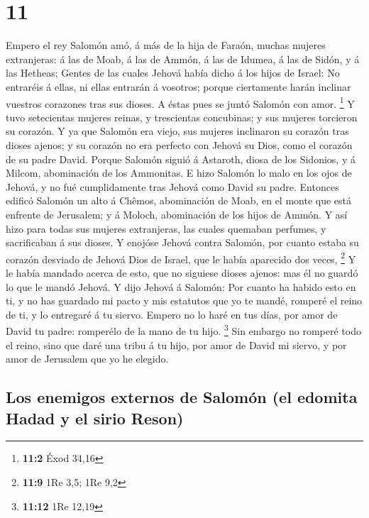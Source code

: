 \hypertarget{section-10}{%
\section{11}\label{section-10}}

 Empero el rey Salomón amó, á más de la hija de Faraón,
muchas mujeres extranjeras: á las de Moab, á las de Ammón, á las de
Idumea, á las de Sidón, y á las Hetheas;  Gentes de las
cuales Jehová había dicho á los hijos de Israel: No entraréis á ellas,
ni ellas entrarán á vosotros; porque ciertamente harán inclinar vuestros
corazones tras sus dioses. A éstas pues se juntó Salomón con amor.
\footnote{\textbf{11:2} Éxod 34,16}  Y tuvo setecientas
mujeres reinas, y trescientas concubinas; y sus mujeres torcieron su
corazón.  Y ya que Salomón era viejo, sus mujeres inclinaron
su corazón tras dioses ajenos; y su corazón no era perfecto con Jehová
su Dios, como el corazón de su padre David.  Porque Salomón
siguió á Astaroth, diosa de los Sidonios, y á Milcom, abominación de los
Ammonitas.  E hizo Salomón lo malo en los ojos de Jehová, y
no fué cumplidamente tras Jehová como David su padre. 
Entonces edificó Salomón un alto á Chêmos, abominación de Moab, en el
monte que está enfrente de Jerusalem; y á Moloch, abominación de los
hijos de Ammón.  Y así hizo para todas sus mujeres
extranjeras, las cuales quemaban perfumes, y sacrificaban á sus dioses.
 Y enojóse Jehová contra Salomón, por cuanto estaba su
corazón desviado de Jehová Dios de Israel, que le había aparecido dos
veces, \footnote{\textbf{11:9} 1Re 3,5; 1Re 9,2}  Y le
había mandado acerca de esto, que no siguiese dioses ajenos: mas él no
guardó lo que le mandó Jehová.  Y dijo Jehová á Salomón:
Por cuanto ha habido esto en ti, y no has guardado mi pacto y mis
estatutos que yo te mandé, romperé el reino de ti, y lo entregaré á tu
siervo.  Empero no lo haré en tus días, por amor de David
tu padre: romperélo de la mano de tu hijo. \footnote{\textbf{11:12} 1Re
  12,19}  Sin embargo no romperé todo el reino, sino que
daré una tribu á tu hijo, por amor de David mi siervo, y por amor de
Jerusalem que yo he elegido.

\hypertarget{los-enemigos-externos-de-salomuxf3n-el-edomita-hadad-y-el-sirio-reson}{%
\subsection{Los enemigos externos de Salomón (el edomita Hadad y el
sirio
Reson)}\label{los-enemigos-externos-de-salomuxf3n-el-edomita-hadad-y-el-sirio-reson}}

